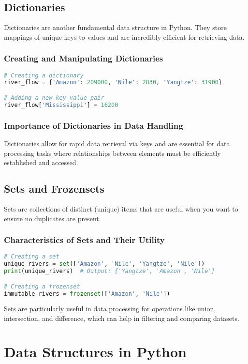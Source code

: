 \subsection{Dictionaries}
Dictionaries are another fundamental data structure in Python. They store mappings of unique keys to values and are incredibly efficient for retrieving data.

\subsubsection{Creating and Manipulating Dictionaries}
\begin{lstlisting}[language=Python]
# Creating a dictionary
river_flow = {'Amazon': 209000, 'Nile': 2830, 'Yangtze': 31900}

# Adding a new key-value pair
river_flow['Mississippi'] = 16200
\end{lstlisting}

\subsubsection{Importance of Dictionaries in Data Handling}
Dictionaries allow for rapid data retrieval via keys and are essential for data processing tasks where relationships between elements must be efficiently established and accessed.

\subsection{Sets and Frozensets}
Sets are collections of distinct (unique) items that are useful when you want to ensure no duplicates are present.

\subsubsection{Characteristics of Sets and Their Utility}
\begin{lstlisting}[language=Python]
# Creating a set
unique_rivers = set(['Amazon', 'Nile', 'Yangtze', 'Nile'])
print(unique_rivers)  # Output: {'Yangtze', 'Amazon', 'Nile'}

# Creating a frozenset
immutable_rivers = frozenset(['Amazon', 'Nile'])
\end{lstlisting}

Sets are particularly useful in data processing for operations like union, intersection, and difference, which can help in filtering and comparing datasets.

\section{Data Structures in Python}

